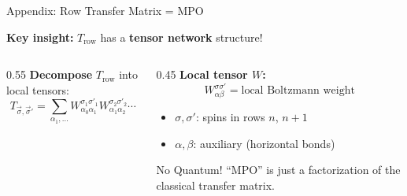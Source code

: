 \documentclass[aspectratio=169, 11pt]{beamer}
\newcommand{\highlight}[1]{\textcolor{accentred}{\textbf{#1}}}
\begin{document}
\begin{frame}{Appendix: Row Transfer Matrix = MPO}
    
    \textbf{Key insight:} $T_{\text{row}}$ has a \highlight{tensor network} structure!
    
    \vspace{0.3cm}
    
    \begin{columns}
        \begin{column}{0.55\textwidth}
            \textbf{Decompose} $T_{\text{row}}$ into local tensors:
            \[
            T_{\vec{\sigma}, \vec{\sigma}'} = \sum_{\alpha_1, \ldots} W^{\sigma_1 \sigma'_1}_{\alpha_0 \alpha_1} W^{\sigma_2 \sigma'_2}_{\alpha_1 \alpha_2} \cdots
            \]
            
            \begin{center}
            \end{center}
        \end{column}
        
        \begin{column}{0.45\textwidth}
            \textbf{Local tensor $W$:}
            \[
            W^{\sigma \sigma'}_{\alpha \beta} = \text{local Boltzmann weight}
            \]
            
            \begin{itemize}
                \item $\sigma, \sigma'$: spins in rows $n$, $n+1$
                \item $\alpha, \beta$: auxiliary (horizontal bonds)
            \end{itemize}
            
            \vspace{0.2cm}
            
            \begin{block}{No Quantum!}
                ``MPO'' is just a factorization of the classical transfer matrix.
            \end{block}
        \end{column}
    \end{columns}
\end{frame}
\end{document}
